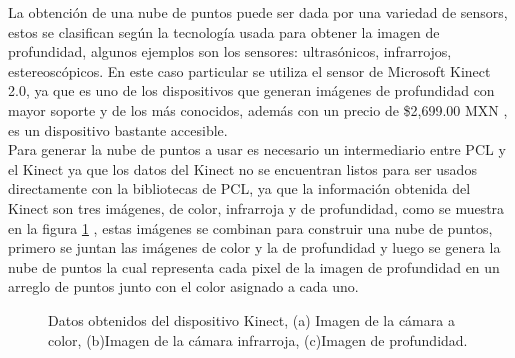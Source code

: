         La obtención de una nube de puntos puede ser dada por una variedad de \glspl{sensor}, estos se clasifican según la tecnología usada para obtener la imagen de profundidad, algunos ejemplos son los sensores: ultrasónicos, infrarrojos, estereoscópicos. En este caso particular se utiliza el sensor de Microsoft Kinect 2.0, ya que es uno de los dispositivos que generan imágenes de profundidad con mayor soporte y de los más conocidos, además con un precio de \$2,699.00 MXN \cite{XBOXONEK76:online}, es un dispositivo bastante accesible.\\
        
        Para generar la nube de puntos a usar es necesario un intermediario entre PCL y el Kinect ya que los datos del Kinect no se encuentran listos para ser usados directamente con la bibliotecas de PCL, ya que la información obtenida del Kinect son tres imágenes, de color, infrarroja y de profundidad, como se muestra en la figura \ref{fig:imgKinect} \cite{UsodelKi56:online}, estas imágenes se combinan para construir una nube de puntos, primero se juntan las imágenes de color y la de profundidad y luego se genera la nube de puntos la cual representa cada pixel de la imagen de profundidad en un arreglo de puntos junto con el color asignado a cada uno. \\
          
         \begin{figure}[!htb] 
         	\centering
         
         	\caption[Datos obtenidos del dispositivo Kinect.]{Datos obtenidos del dispositivo Kinect, (a) Imagen de la cámara a color, (b)Imagen de la cámara infrarroja, (c)Imagen de profundidad.} 
         	\label{fig:imgKinect}
         \end{figure}
         
